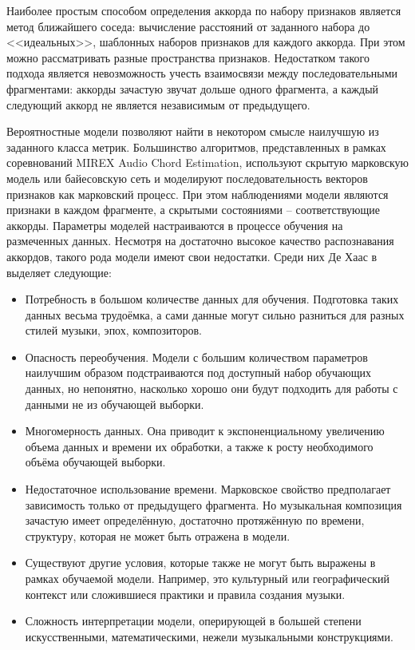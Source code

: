 Наиболее простым способом определения аккорда по набору признаков является метод
ближайшего соседа: вычисление расстояний от заданного набора до <<идеальных>>,
шаблонных наборов признаков для каждого аккорда. При этом можно рассматривать
разные пространства признаков. Недостатком такого подхода является невозможность
учесть взаимосвязи между последовательными фрагментами: аккорды зачастую звучат
дольше одного фрагмента, а каждый следующий аккорд не является независимым от
предыдущего.

Вероятностные модели позволяют найти в некотором смысле наилучшую из заданного
класса метрик. Большинство алгоритмов, представленных в рамках соревнований
MIREX Audio Chord Estimation, используют скрытую марковскую модель или
байесовскую сеть и моделируют последовательность векторов признаков как
марковский процесс. При этом наблюдениями модели являются признаки в каждом
фрагменте, а скрытыми состояниями -- соответствующие аккорды. Параметры моделей
настраиваются в процессе обучения на размеченных данных. Несмотря на достаточно
высокое качество распознавания аккордов, такого рода модели имеют свои
недостатки. Среди них Де Хаас в \cite{DeHaas2012} выделяет следующие:
\begin{itemize}
  \item Потребность в большом количестве данных для обучения. Подготовка таких
  данных весьма трудоёмка, а сами данные могут сильно разниться для разных
  стилей музыки, эпох, композиторов.
  
  \item Опасность переобучения. Модели с большим количеством параметров
  наилучшим образом подстраиваются под доступный набор обучающих данных, но
  непонятно, насколько хорошо они будут подходить для работы с данными не из
  обучающей выборки.
  
  \item Многомерность данных. Она приводит к экспоненциальному увеличению объема
  данных и времени их обработки, а также к росту необходимого объёма обучающей
  выборки.
  
  \item Недостаточное использование времени. Марковское свойство предполагает
  зависимость только от предыдущего фрагмента. Но музыкальная композиция
  зачастую имеет определённую, достаточно протяжённую по времени, структуру,
  которая не может быть отражена в модели.
  
  \item Существуют другие условия, которые также не могут быть выражены в рамках
  обучаемой модели. Например, это культурный или географический контекст или
  сложившиеся практики и правила создания музыки.
  
  \item Сложность интерпретации модели, оперирующей в большей степени
  искусственными, математическими, нежели музыкальными конструкциями.
\end{itemize}

